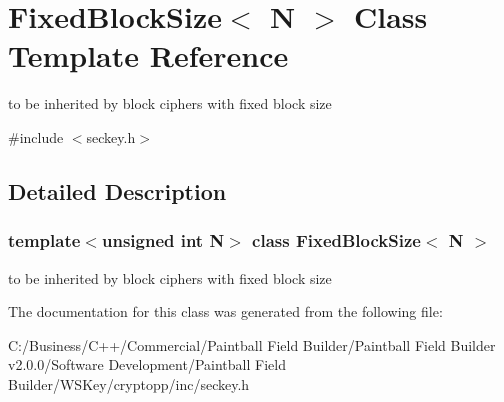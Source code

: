 \hypertarget{class_fixed_block_size}{
\section{FixedBlockSize$<$ N $>$ Class Template Reference}
\label{class_fixed_block_size}
}


to be inherited by block ciphers with fixed block size  


{\ttfamily \#include $<$seckey.h$>$}

\subsection{Detailed Description}
\subsubsection*{template$<$unsigned int N$>$ class FixedBlockSize$<$ N $>$}

to be inherited by block ciphers with fixed block size 

The documentation for this class was generated from the following file:\begin{DoxyCompactItemize}
\item 
C:/Business/C++/Commercial/Paintball Field Builder/Paintball Field Builder v2.0.0/Software Development/Paintball Field Builder/WSKey/cryptopp/inc/seckey.h\end{DoxyCompactItemize}
